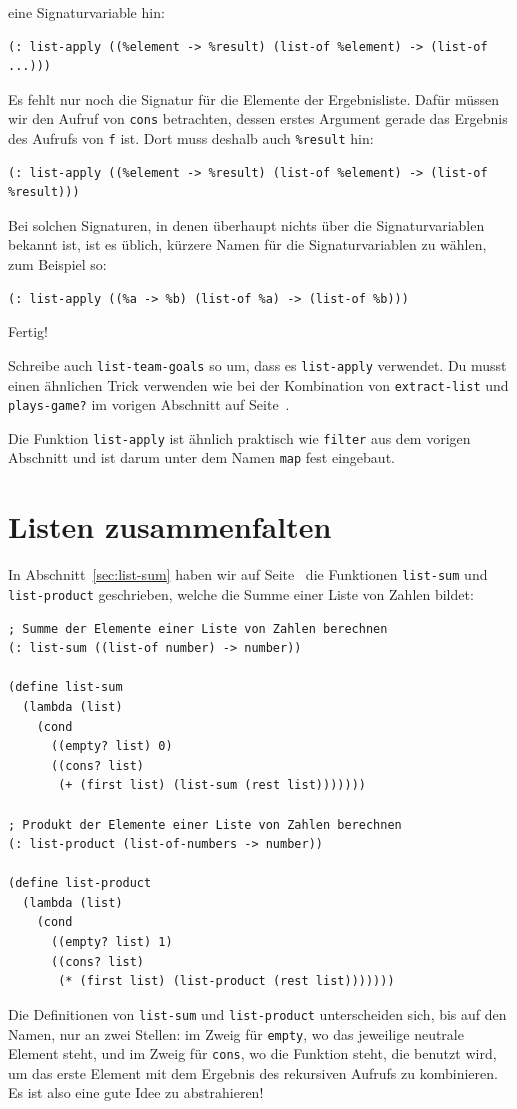 eine Signaturvariable hin:
%
\begin{lstlisting}
(: list-apply ((%element -> %result) (list-of %element) -> (list-of ...)))
\end{lstlisting}
%
Es fehlt nur noch die Signatur für die Elemente der Ergebnisliste.
Dafür müssen wir den Aufruf von \lstinline{cons} betrachten, dessen
erstes Argument gerade das Ergebnis des Aufrufs von \lstinline{f}
ist.  Dort muss deshalb auch \lstinline{%result} hin:
%
\begin{lstlisting}
(: list-apply ((%element -> %result) (list-of %element) -> (list-of %result)))
\end{lstlisting}
%
Bei solchen Signaturen, in denen überhaupt nichts über die
Signaturvariablen bekannt ist, ist es üblich, kürzere Namen für die
Signaturvariablen zu wählen, zum Beispiel so:
%
\begin{lstlisting}
(: list-apply ((%a -> %b) (list-of %a) -> (list-of %b)))
\end{lstlisting}
%
Fertig!
%
\begin{aufgabeinline}
  Schreibe auch \lstinline{list-team-goals} so um, dass es
  \lstinline{list-apply} verwendet.  Du musst einen ähnlichen Trick
  verwenden wie bei der Kombination von \lstinline{extract-list} und
  \lstinline{plays-game?} im vorigen Abschnitt auf
  Seite~\pageref{code:extract-list-plays-game}.
\end{aufgabeinline}
%
Die Funktion \lstinline{list-apply} ist ähnlich praktisch wie
\lstinline{filter} aus dem vorigen Abschnitt und ist darum unter dem
Namen \lstinline{map} fest eingebaut.

\section{Listen zusammenfalten}

In Abschnitt~\ref{sec:list-sum} haben wir auf
Seite~\pageref{sec:list-sum} die Funktionen \lstinline{list-sum} und
\lstinline{list-product} geschrieben, welche die Summe einer Liste von
Zahlen bildet:
%
\begin{lstlisting}
; Summe der Elemente einer Liste von Zahlen berechnen
(: list-sum ((list-of number) -> number))

(define list-sum
  (lambda (list)
    (cond
      ((empty? list) 0)
      ((cons? list)
       (+ (first list) (list-sum (rest list)))))))

; Produkt der Elemente einer Liste von Zahlen berechnen
(: list-product (list-of-numbers -> number))

(define list-product
  (lambda (list)
    (cond
      ((empty? list) 1)
      ((cons? list)
       (* (first list) (list-product (rest list)))))))
\end{lstlisting}
%
Die Definitionen von \lstinline{list-sum} und \lstinline{list-product}
unterscheiden sich, bis auf den Namen, nur an zwei Stellen: im Zweig
für \lstinline{empty}, wo das jeweilige neutrale Element steht, und im
Zweig für \lstinline{cons}, wo die Funktion steht, die benutzt wird,
um das erste Element mit dem Ergebnis des rekursiven Aufrufs zu
kombinieren.  Es ist also eine gute Idee zu abstrahieren!

